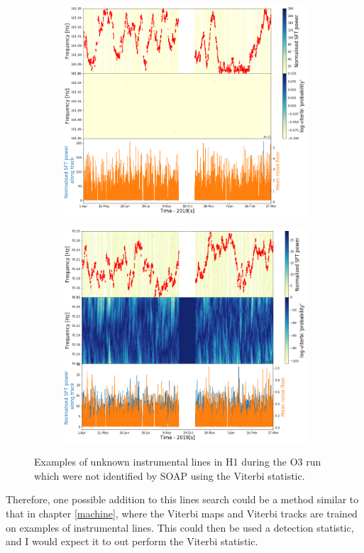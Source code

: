 \begin{figure}[hpt]
	\begin{subfigure}[h]{0.49\textwidth}
		\includegraphics[width=\textwidth]{C6_detchar/track_F101_85_101_95.png}
		\caption{\label{detchar:soap:unknown:3}}
	\end{subfigure}
	\begin{subfigure}[h]{0.49\textwidth}
		\includegraphics[width=\textwidth]{C6_detchar/track_F70_15_70_25.png}
		\caption{\label{detchar:soap:unknown:4}}
	\end{subfigure}
	\caption[lines from unknown sources]{Examples of unknown instrumental lines in H1 during the O3 run which were not identified by SOAP using the Viterbi statistic. }
	\label{detchar:soap:unknown}
\end{figure}
%
Therefore, one possible addition to this lines search could be a method similar to that in chapter \ref{machine}, where the Viterbi maps and Viterbi tracks are trained on examples of instrumental lines. 
This could then be used a detection statistic, and I would expect it to out perform the Viterbi statistic.

